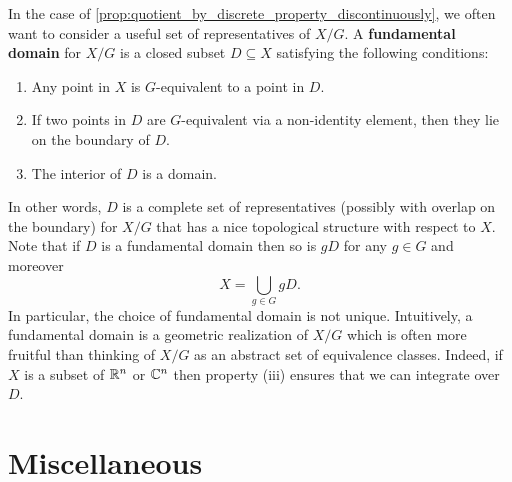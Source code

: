     In the case of \cref{prop:quotient_by_discrete_property_discontinuously}, we often want to consider a useful set of representatives of $X/G$. A \textbf{fundamental domain} for $X/G$ is a closed subset $D \subseteq X$ satisfying the following conditions:
      \begin{enumerate}[label=(\roman*)]
        \item Any point in $X$ is $G$-equivalent to a point in $D$.
        \item If two points in $D$ are $G$-equivalent via a non-identity element, then they lie on the boundary of $D$.
        \item The interior of $D$ is a domain.
      \end{enumerate}
      In other words, $D$ is a complete set of representatives (possibly with overlap on the boundary) for $X/G$ that has a nice topological structure with respect to $X$. Note that if $D$ is a fundamental domain then so is $gD$ for any $g \in G$ and moreover
      \[
        X = \bigcup_{g \in G}gD.
      \]
      In particular, the choice of fundamental domain is not unique. Intuitively, a fundamental domain is a geometric realization of $X/G$ which is often more fruitful than thinking of $X/G$ as an abstract set of equivalence classes. Indeed, if $X$ is a subset of $\mathbb{R}^{n}$ or $\mathbb{C}^{n}$ then property (iii) ensures that we can integrate over $D$.
\chapter{Miscellaneous}
